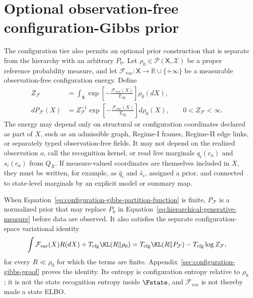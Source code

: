 \section{Optional observation-free configuration-Gibbs prior}

The configuration tier also permits an optional prior construction that is separate from the hierarchy with an arbitrary \(P_0\). Let \(\rho_0\in\mathcal P(\mathsf X,\mathscr X)\) be a proper reference probability measure, and let
\(\mathcal F_{\mathrm{vac}}:\mathsf X\to\mathbb R\cup\{+\infty\}\) be a measurable observation-free configuration energy. Define
\begin{align}
Z_{\mathcal F}
&=\int_{\mathsf X}
\exp\left[-\frac{\mathcal F_{\mathrm{vac}}(X)}{T_{\mathrm{cfg}}}\right]
\rho_0(dX),
\label{eq:configuration-gibbs-partition-function}\\
dP_{\mathcal F}(X)
&=Z_{\mathcal F}^{-1}
\exp\left[-\frac{\mathcal F_{\mathrm{vac}}(X)}{T_{\mathrm{cfg}}}\right]
d\rho_0(X),
\qquad
0<Z_{\mathcal F}<\infty.
\label{eq:configuration-gibbs-prior}
\end{align}
The energy may depend only on structural or configuration coordinates declared as part of \(X\), such as an admissible graph, Regime-I frames, Regime-II edge links, or separately typed observation-free fields. It may not depend on the realized observation \(o\), call the recognition kernel, or read live marginals \(q_i(c_a)\) and \(s_i(c_a)\) from \(Q_X\). If measure-valued coordinates are themselves included in \(X\), they must be written, for example, as \(\widehat q_i\) and \(\widehat s_i\), assigned a prior, and connected to state-level marginals by an explicit model or summary map.

When Equation~\eqref{eq:configuration-gibbs-partition-function} is finite, \(P_{\mathcal F}\) is a normalized prior that may replace \(P_0\) in Equation~\eqref{eq:hierarchical-generative-measure} before data are observed. It also satisfies the separate configuration-space variational identity
\begin{equation}
\int\mathcal F_{\mathrm{vac}}(X)R(dX)
+T_{\mathrm{cfg}}\KL(R\Vert\rho_0)
=T_{\mathrm{cfg}}\KL(R\Vert P_{\mathcal F})
-T_{\mathrm{cfg}}\log Z_{\mathcal F},
\label{eq:configuration-gibbs-variational-identity}
\end{equation}
for every \(R\ll\rho_0\) for which the terms are finite. Appendix~\ref{sec:configuration-gibbs-proof} proves the identity. Its entropy is configuration entropy relative to \(\rho_0\); it is not the state recognition entropy inside \(\Fstate\), and \(\mathcal F_{\mathrm{vac}}\) is not thereby made a state ELBO.

